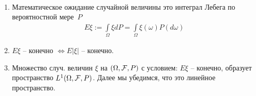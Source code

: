 \begin{remark}~
  \begin{enumerate}
    \item
      Математическое ожидание случайной величины это интеграл Лебега по вероятностной мере~$P$
      \begin{align*}
        E\xi := \int\limits_{\Omega} \xi dP = \int\limits_{\Omega} \xi(\omega) P(d\omega)
      \end{align*}

    \item
      $E\xi$ -- конечно $\Leftrightarrow E|\xi|$ -- конечно.

    \item
      Множество случ. величин $\xi$ на $(\Omega, \mathcal{F}, P)$ с условием: $E\xi$ -- конечно, образует
      пространство $L^1(\Omega, \mathcal{F}, P)$. Далее мы убедимся, что это линейное пространство.

  \end{enumerate}
\end{remark}


